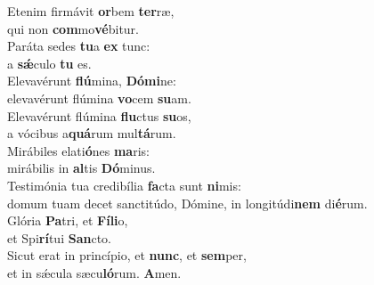 \evenverse Etenim firmávit \textbf{or}bem \textbf{ter}ræ,~\*\\
\evenverse qui non \textbf{com}mo\textbf{vé}bitur.\\
\oddverse Paráta sedes \textbf{tu}a \textbf{ex} tunc:~\*\\
\oddverse a \textbf{sǽ}culo \textbf{tu} es.\\
\evenverse Elevavérunt \textbf{flú}mina, \textbf{Dó}\textbf{mi}ne:~\*\\
\evenverse elevavérunt flúmina \textbf{vo}cem \textbf{su}am.\\
\oddverse Elevavérunt flúmina \textbf{flu}ctus \textbf{su}os,~\*\\
\oddverse a vócibus a\textbf{quá}rum mul\textbf{tá}rum.\\
\evenverse Mirábiles elati\textbf{ó}nes \textbf{ma}ris:~\*\\
\evenverse mirábilis in \textbf{al}tis \textbf{Dó}minus.\\
\oddverse Testimónia tua credibília \textbf{fa}cta sunt \textbf{ni}mis:~\*\\
\oddverse domum tuam decet sanctitúdo, Dómine, in longitúdi\textbf{nem} di\textbf{é}rum.\\
\evenverse Glória \textbf{Pa}tri, et \textbf{Fí}\textbf{li}o,~\*\\
\evenverse et Spi\textbf{rí}tui \textbf{San}cto.\\
\oddverse Sicut erat in princípio, et \textbf{nunc}, et \textbf{sem}per,~\*\\
\oddverse et in sǽcula sæcu\textbf{ló}rum. \textbf{A}men.\\
